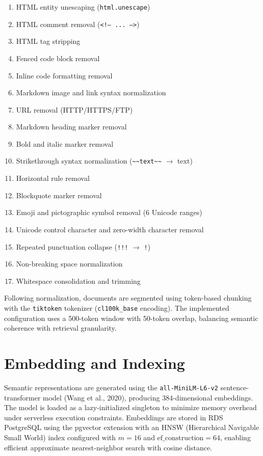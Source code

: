 \documentclass[12pt,a4paper]{report}
\begin{document}
\begin{enumerate}[leftmargin=0.5in]
  \item HTML entity unescaping (\texttt{html.unescape})
  \item HTML comment removal (\texttt{<!-- ... -->})
  \item HTML tag stripping
  \item Fenced code block removal
  \item Inline code formatting removal
  \item Markdown image and link syntax normalization
  \item URL removal (HTTP/HTTPS/FTP)
  \item Markdown heading marker removal
  \item Bold and italic marker removal
  \item Strikethrough syntax normalization (\texttt{\~{}\~{}text\~{}\~{}} $\to$ text)
  \item Horizontal rule removal
  \item Blockquote marker removal
  \item Emoji and pictographic symbol removal (6 Unicode ranges)
  \item Unicode control character and zero-width character removal
  \item Repeated punctuation collapse (\texttt{!!!} $\to$ \texttt{!})
  \item Non-breaking space normalization
  \item Whitespace consolidation and trimming
\end{enumerate}

Following normalization, documents are segmented using token-based chunking with the \texttt{tiktoken} tokenizer (\texttt{cl100k\_base} encoding). The implemented configuration uses a 500-token window with 50-token overlap, balancing semantic coherence with retrieval granularity.

\section{Embedding and Indexing}
\label{sec:embedding}

Semantic representations are generated using the \texttt{all-MiniLM-L6-v2} sentence-transformer model (Wang et al., 2020), producing 384-dimensional embeddings. The model is loaded as a lazy-initialized singleton to minimize memory overhead under serverless execution constraints. Embeddings are stored in RDS PostgreSQL using the pgvector extension with an HNSW (Hierarchical Navigable Small World) index configured with $m = 16$ and $\text{ef\_construction} = 64$, enabling efficient approximate nearest-neighbor search with cosine distance.
\end{document}
